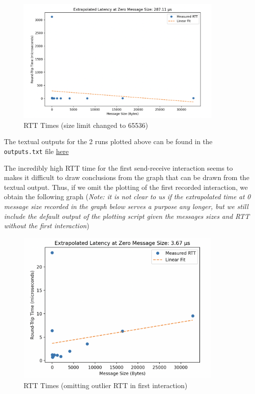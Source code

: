 \documentclass[a4paper,10pt]{article}
\begin{document}
  \begin{figure}[H]
    \centering
    \includegraphics[width=0.9\textwidth]{img/bonus_lim65536}
    \caption{RTT Times (size limit changed to 65536)}
    \label{fig:bonus_rtt_large}
  \end{figure}

The textual outputs for the 2 runs plotted above can be found in the \verb|outputs.txt| file \href{https://github.com/paulmyr/DD2356-MethodsHPC/blob/master/2_hpc_arch_perf_model/bonus/outputs.txt}{here}

The incredibly high RTT time for the first send-receive interaction seems to makes it difficult to draw conclusions from the graph that can be drawn from the textual output. Thus, if we omit the plotting of the first recorded interaction, we obtain the following graph (\textit{Note: it is not clear to us if the extrapolated time at 0 message size recorded in the graph below serves a purpose any longer, but we still include the default output of the plotting script given the messages sizes and RTT without the first interaction})

  \begin{figure}[H]
    \centering
    \includegraphics[width=0.9\textwidth]{img/bonus_large_pattern}
    \caption{RTT Times (omitting outlier RTT in first interaction)}
    \label{fig:bonus_rtt_pattern}
  \end{figure}
\end{document}
